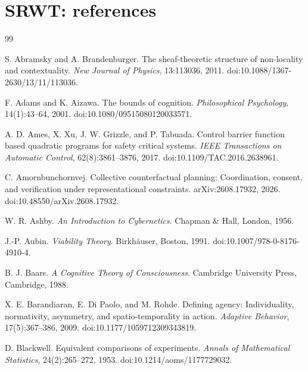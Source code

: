 \documentclass[11pt,oneside,openany]{book}
\numberwithin{equation}{section}
\begin{document}
\chapter{SRWT: references}
\begin{thebibliography}{99}
\small

S. Abramsky and A. Brandenburger.
\newblock The sheaf-theoretic structure of non-locality and contextuality.
\newblock \emph{New Journal of Physics}, 13:113036, 2011.
\newblock doi:10.1088/1367-2630/13/11/113036.

F. Adams and K. Aizawa.
\newblock The bounds of cognition.
\newblock \emph{Philosophical Psychology}, 14(1):43--64, 2001.
\newblock doi:10.1080/09515080120033571.

A. D. Ames, X. Xu, J. W. Grizzle, and P. Tabuada.
\newblock Control barrier function based quadratic programs for safety critical systems.
\newblock \emph{IEEE Transactions on Automatic Control}, 62(8):3861--3876, 2017.
\newblock doi:10.1109/TAC.2016.2638961.

C. Amornbunchornvej.
\newblock Collective counterfactual planning: Coordination, consent, and verification under representational constraints.
\newblock arXiv:2608.17932, 2026.
\newblock doi:10.48550/arXiv.2608.17932.

W. R. Ashby.
\newblock \emph{An Introduction to Cybernetics}.
\newblock Chapman \& Hall, London, 1956.

J.-P. Aubin.
\newblock \emph{Viability Theory}.
\newblock Birkh\"auser, Boston, 1991.
\newblock doi:10.1007/978-0-8176-4910-4.

B. J. Baars.
\newblock \emph{A Cognitive Theory of Consciousness}.
\newblock Cambridge University Press, Cambridge, 1988.

X. E. Barandiaran, E. Di Paolo, and M. Rohde.
\newblock Defining agency: Individuality, normativity, asymmetry, and spatio-temporality in action.
\newblock \emph{Adaptive Behavior}, 17(5):367--386, 2009.
\newblock doi:10.1177/1059712309343819.

D. Blackwell.
\newblock Equivalent comparisons of experiments.
\newblock \emph{Annals of Mathematical Statistics}, 24(2):265--272, 1953.
\newblock doi:10.1214/aoms/1177729032.



\end{thebibliography}
\end{document}
